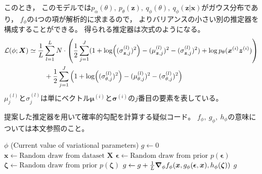 \documentclass[dvipdfmx, fleqn, draft]{jsarticle}
\begin{document}
このとき，
このモデルでは\(p_{\alpha} (\theta),\ p_{\theta} (\bm{z}),\ q_{\phi} (\theta),\ q_{\phi} (\bm{z} | \bm{x})\)がガウス分布であり，
\(f_{\phi}\)の4つの項が解析的に求まるので，
よりバリアンスの小さい別の推定器を構成することができる。
得られる推定器は次式のようになる。
\begin{align}
    \mathcal{L}(\phi; \bm{X})
        & \simeq \frac{1}{L} \sum_{l=1}^{L} N \cdot \qty(
            \frac{1}{2} \sum_{j=1}^{J} (1 + \log((\sigma_{\bm{z}, j}^{(l)})^2) - (\mu_{\bm{z}, j}^{(l)})^2 - (\sigma_{\bm{z}, j}^{(l)})^2)
            + \log{p_{\theta} (\bm{x}^{(i)} \bm{z}^{(i)})}
            )
        \notag \\
        & \ \qquad
            + \frac{1}{2} \sum_{j=1}^{J} \qty(1 + \log((\sigma_{\theta, j}^{(l)})^2) - (\mu_{\theta, j}^{(l)})^2 - (\sigma_{\theta, j}^{(l)})^2)
\end{align}
\(\mu_j^{(l)}\)と\(\sigma_j^{(l)}\)は単にベクトル\(\bm{\mu}^{(i)}\)と\(\bm{\sigma}^{(i)}\)の\(j\)番目の要素を表している。


\begin{algorithm}
    \caption{
        提案した推定器を用いて確率的勾配を計算する疑似コード。
        \(f_{\phi},\ g_{\phi},\ h_{\phi}\)の意味については本文参照のこと。
        }
    \label{algo:pseudo_SGD}
    \begin{algorithmic}
        \REQUIRE \(\phi\) (Current value of variational parameters)
        \STATE \(g \leftarrow 0\)
            \STATE \(\bm{x} \leftarrow \text{Random draw from dataset } \bm{X}\)
            \STATE \(\bm{\epsilon} \leftarrow \text{Random draw from prior } p(\bm{\epsilon})\)
            \STATE \(\bm{\zeta} \leftarrow \text{Random draw from prior } p(\bm{\zeta})\)
            \STATE \(g \leftarrow g + \frac{1}{L} \grad_{\phi} f_{\phi} (\bm{x}, g_{\phi} (\bm{\epsilon}, \bm{x}), h_{\phi} (\bm{\zeta})) \)
        \ENDFOR
        \RETURN \(g\)
    \end{algorithmic}
\end{algorithm}
\end{document}
